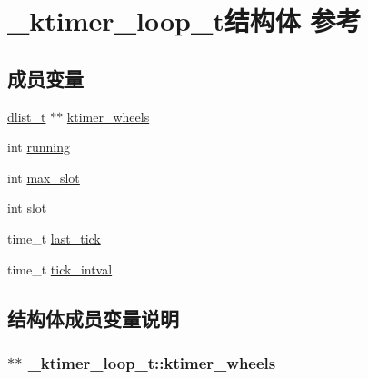 \hypertarget{a00022}{}\section{\+\_\+ktimer\+\_\+loop\+\_\+t结构体 参考}
\label{a00022}
\subsection*{成员变量}
\begin{DoxyCompactItemize}
\item 
\hyperlink{a00047_ad6644d67df4b4e3596c1eb12977d1d16_ad6644d67df4b4e3596c1eb12977d1d16}{dlist\+\_\+t} $\ast$$\ast$ \hyperlink{a00022_af68f6f946f2b3583d04d8a459b738d29_af68f6f946f2b3583d04d8a459b738d29}{ktimer\+\_\+wheels}
\item 
int \hyperlink{a00022_aab0b79491b93f3752c93dfb1d8c60e66_aab0b79491b93f3752c93dfb1d8c60e66}{running}
\item 
int \hyperlink{a00022_aeb8772fdff5de87ce1db9878f1357043_aeb8772fdff5de87ce1db9878f1357043}{max\+\_\+slot}
\item 
int \hyperlink{a00022_ae54f1df7a355b968dcc9baf7dca10a8d_ae54f1df7a355b968dcc9baf7dca10a8d}{slot}
\item 
time\+\_\+t \hyperlink{a00022_aa0cf5e5f3b5532aa4335d25831c9d2c3_aa0cf5e5f3b5532aa4335d25831c9d2c3}{last\+\_\+tick}
\item 
time\+\_\+t \hyperlink{a00022_a5bfbb75720e6a5310417980347763c82_a5bfbb75720e6a5310417980347763c82}{tick\+\_\+intval}
\end{DoxyCompactItemize}


\subsection{结构体成员变量说明}
\hypertarget{a00022_af68f6f946f2b3583d04d8a459b738d29_af68f6f946f2b3583d04d8a459b738d29}{}
\subsubsection[{ktimer\+\_\+wheels}]{$\ast$$\ast$ \+\_\+ktimer\+\_\+loop\+\_\+t\+::ktimer\+\_\+wheels}\label{a00022_af68f6f946f2b3583d04d8a459b738d29_af68f6f946f2b3583d04d8a459b738d29}
\hypertarget{a00022_aa0cf5e5f3b5532aa4335d25831c9d2c3_aa0cf5e5f3b5532aa4335d25831c9d2c3}{}
